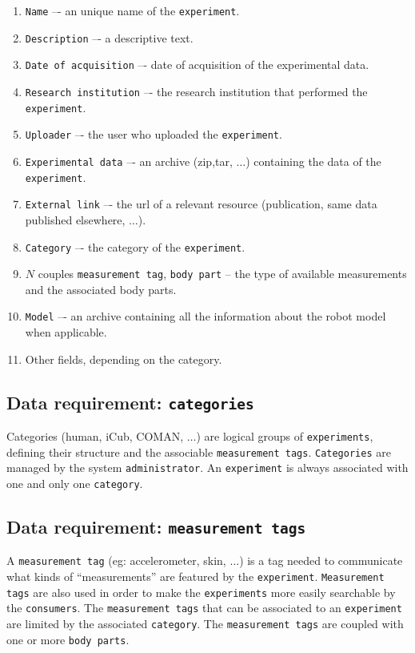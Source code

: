 \documentclass[12pt,a4paper,twoside]{article}
\begin{document}
\begin{enumerate}
\item \texttt{Name} –- an unique name of the \texttt{experiment}.
\item \texttt{Description} –- a descriptive text.
\item \texttt{Date of acquisition} –- date of acquisition of the experimental data.
\item\texttt{Research institution} –- the research institution that performed the \texttt{experiment}.
\item \texttt{Uploader} –- the user who uploaded the \texttt{experiment}.
\item \texttt{Experimental data} –- an archive (zip,tar, $\dots$) containing the data of the \texttt{experiment}.
\item \texttt{External link} –- the url of a relevant resource (publication, same data published elsewhere, $\dots$).
\item \texttt{Category} –- the category of the \texttt{experiment}.
\item $N$ couples \texttt{measurement tag}, \texttt{body part} -- the type of available measurements and the associated body parts.
\item \texttt{Model} –- an archive containing all the information about the robot model when applicable.
\item Other fields, depending on the category.
\end{enumerate}

\subsection{Data requirement: \texttt{categories}}
Categories (human, iCub, COMAN, $\dots$) are logical groups of \texttt{experiments}, defining their structure and the associable \texttt{measurement tags}. \texttt{Categories} are managed by the system \texttt{administrator}. An \texttt{experiment} is always associated with one and only one \texttt{category}.

\subsection{Data requirement: \texttt{measurement tags}}
A \texttt{measurement tag} (eg: accelerometer, skin, $\dots$) is a tag needed to communicate what kinds of “measurements” are featured by the \texttt{experiment}. \texttt{Measurement tags} are also used in order to make the \texttt{experiments} more easily searchable by the \texttt{consumers}. The \texttt{measurement tags} that can be associated to an \texttt{experiment} are limited by the associated \texttt{category}. The \texttt{measurement tags} are coupled with one or more \texttt{body parts}.
\end{document}
